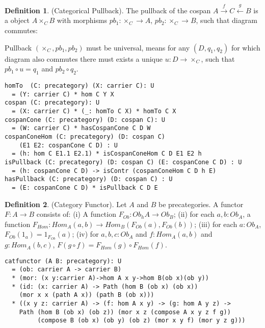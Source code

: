\documentclass{article}
\theoremstyle{definition}
\newtheorem{definition}{Definition}
\def\mapright#1{\xrightarrow{{#1}}}
\def\mapleft#1{\xleftarrow{{#1}}}
\begin{document}
\begin{definition} (Categorical Pullback).
The pullback of the cospan $A \mapright{f} C \mapleft{g} B$ is a object $A \times_{C} B$ with
morphisms $pb_1 : \times_C \rightarrow A $, $pb_2 : \times_C \rightarrow B$, such that
diagram commutes:
\begin{center}
\end{center}
Pullback $(\times_C,pb_1,pb_2)$ must be universal, means for any $(D,q_1,q_2)$
for which diagram also commutes there must exists a unique $u: D \rightarrow \times_C$,
such that $pb_1 \circ u = q_1$ and $pb_2 \circ q_2$.
\begin{lstlisting}
homTo  (C: precategory) (X: carrier C): U
  = (Y: carrier C) * hom C Y X
cospan (C: precategory): U
  = (X: carrier C) * (_: homTo C X) * homTo C X
cospanCone (C: precategory) (D: cospan C): U
  = (W: carrier C) * hasCospanCone C D W
cospanConeHom (C: precategory) (D: cospan C)
    (E1 E2: cospanCone C D) : U
  = (h: hom C E1.1 E2.1) * isCospanConeHom C D E1 E2 h
isPullback (C: precategory) (D: cospan C) (E: cospanCone C D) : U
  = (h: cospanCone C D) -> isContr (cospanConeHom C D h E)
hasPullback (C: precategory) (D: cospan C) : U
  = (E: cospanCone C D) * isPullback C D E
\end{lstlisting}
\end{definition}

\begin{definition} (Category Functor).
Let $A$ and $B$ be precategories.
A functor $F : A \rightarrow B$ consists of: (i) A function $F_{Ob}: Ob_hA \rightarrow Ob_B$;
(ii) for each $a,b:Ob_A$, a function $F_{Hom}:Hom_A(a,b)\rightarrow Hom_B(F_{Ob}(a),F_{Ob}(b))$;
(iii) for each $a:Ob_A$, $F_{Ob}(1_a) = 1_{F_{Ob}}(a)$;
(iv) for $a,b,c:Ob_A$ and $f: Hom_A(a,b)$ and $g: Hom_A(b,c)$, $F(g\circ f) = F_{Hom}(g)\circ F_{Hom}(f)$.
\begin{lstlisting}
catfunctor (A B: precategory): U
  = (ob: carrier A -> carrier B)
  * (mor: (x y:carrier A)->hom A x y->hom B(ob x)(ob y))
  * (id: (x: carrier A) -> Path (hom B (ob x) (ob x))
    (mor x x (path A x)) (path B (ob x)))
  * ((x y z: carrier A) -> (f: hom A x y) -> (g: hom A y z) ->
    Path (hom B (ob x) (ob z)) (mor x z (compose A x y z f g))
         (compose B (ob x) (ob y) (ob z) (mor x y f) (mor y z g)))
\end{lstlisting}
\end{definition}
\end{document}
